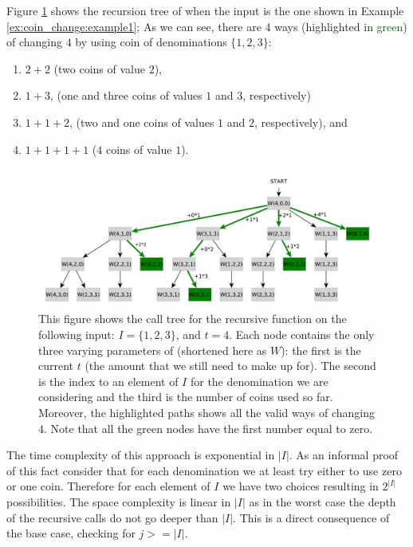 Figure \ref{fig:coin_change:recursiontree} shows the recursion tree of  
when the input is the one shown in Example \ref{ex:coin_change:example1}; As we can see, there are $4$ ways (highlighted in \textcolor{darkgreen}{green}) of changing $4$ by using coin of denominations $\{1,2,3\}$:
\begin{enumerate}
	\item $2+2$ (two coins of value $2$),
	\item $1+3$, (one and three coins of values $1$ and $3$, respectively)
	\item $1+1+2$, (two and one coins of values $1$ and $2$, respectively), and
	\item $1+1+1+1$ ($4$ coins of value $1$).
\end{enumerate}
\begin{figure}
	\centering
	\includegraphics[width=\textwidth]{sources/coin_change/images/recursiontree}
	\captionsetup{singlelinecheck=off}
	\caption{This figure shows the call tree for the recursive function  on the following input:  $I = \{1,2,3\}$, and $t=4$. Each node contains the only three varying parameters of  (shortened here as $W$): the first is the current $t$ (the amount that we still need to make up for). The second   is the index to an element of $I$ for the denomination we are considering and the third is the number of coins used so far.
	Moreover, the highlighted paths shows all the valid ways of changing $4$. Note that all the green nodes have the first number equal to zero.}
	\label{fig:coin_change:recursiontree}
\end{figure}

The time complexity of this approach is exponential in $|I|$. 
As an informal proof of this fact consider that for each denomination we at least try either to use zero or one coin. 
Therefore for each element of $I$ we have two choices resulting in $2^{|I|}$ possibilities. 
The space complexity is linear in $|I|$ as in the worst case the depth of the recursive calls do not go deeper than $|I|$. This is a direct consequence of the base case, checking for $j >= |I|$.

